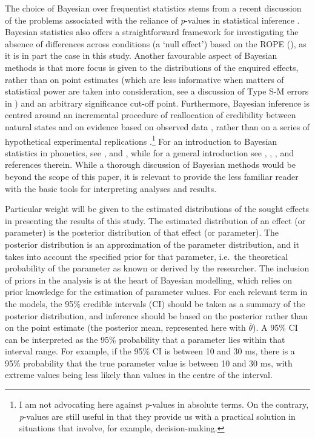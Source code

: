 \documentclass[
  12pt,
  a4paper,
]{article}
\begin{document}
The choice of Bayesian over frequentist statistics stems from a recent
discussion of the problems associated with the reliance of
\emph{p}-values in statistical inference
\citep{wagenmakers2007, munafo2017, kirby2018, roettger2019}. Bayesian
statistics also offers a straightforward framework for investigating the
absence of differences across conditions (a `null effect') based on the
ROPE (), as it is in part the case in this study.
Another favourable aspect of Bayesian methods is that more focus is
given to the distributions of the enquired effects, rather than on point
estimates (which are less informative when matters of statistical power
are taken into consideration, see a discussion of Type S-M errors in
\citealt{kirby2018}) and an arbitrary significance cut-off point.
Furthermore, Bayesian inference is centred around an incremental
procedure of reallocation of credibility between natural states and on
evidence based on observed data \citep{kruschke2015}, rather than on a
series of hypothetical experimental replications
\citep{wagenmakers2007}.\footnote{I am not advocating here against \textit{p}-values in absolute terms. On the contrary, \textit{p}-values are still useful in that they provide us with a practical solution in situations that involve, for example, decision-making.}
For an introduction to Bayesian statistics in phonetics, see
\citet{vasishth2018}, and \citet{nicenboim2018a}, while for a general
introduction see \citet{etz2018}, \citet{mcelreath2015},
\citet{kruschke2015}, and references therein. While a thorough
discussion of Bayesian methods would be beyond the scope of this paper,
it is relevant to provide the less familiar reader with the basic tools
for interpreting analyses and results.

Particular weight will be given to the estimated distributions of the
sought effects in presenting the results of this study. The estimated
distribution of an effect (or parameter) is the posterior distribution
of that effect (or parameter). The posterior distribution is an
approximation of the parameter distribution, and it takes into account
the specified prior for that parameter, i.e.~the theoretical probability
of the parameter as known or derived by the researcher. The inclusion of
priors in the analysis is at the heart of Bayesian modelling, which
relies on prior knowledge for the estimation of parameter values. For
each relevant term in the models, the 95\% credible intervals (CI)
should be taken as a summary of the posterior distribution, and
inference should be based on the posterior rather than on the point
estimate (the posterior mean, represented here with \(\bar{\theta}\)). A
95\% CI can be interpreted as the 95\% probability that a parameter lies
within that interval range. For example, if the 95\% CI is between 10
and 30 ms, there is a 95\% probability that the true parameter value is
between 10 and 30 ms, with extreme values being less likely than values
in the centre of the interval.
\end{document}
